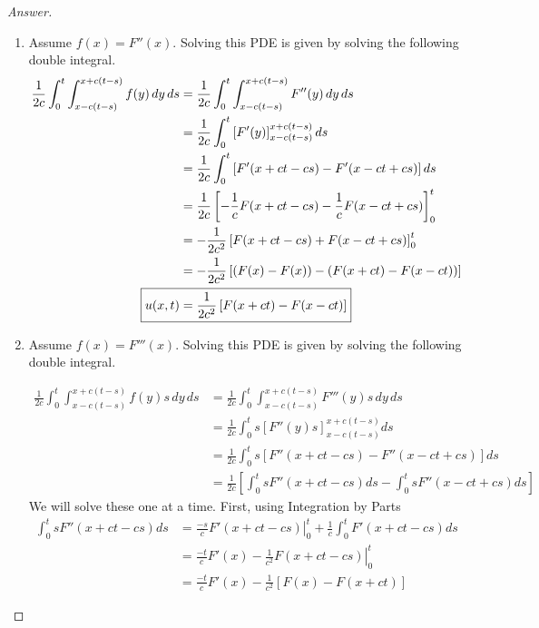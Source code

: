 \documentclass{article}
\theoremstyle{definition}
\renewcommand\qedsymbol{$\blacksquare$}
\newenvironment{ans}{\begin{proof}[Answer]\renewcommand{\qedsymbol}{}}{\end{proof}}
\begin{document}
\begin{ans}
\begin{enumerate}[(1), series=answers]
            \item Assume $f(x) = F''(x)$. Solving this PDE is given by solving the following double integral.
            \begin{align*}
                \frac{1}{2c}\int_0^t\int_{x-c(t-s)}^{x+c(t-s)}f(y)\,dy\,ds &= \frac{1}{2c}\int_0^t\int_{x-c(t-s)}^{x+c(t-s)}F''(y)\,dy\,ds\\
                &=\frac{1}{2c}\int_0^t\left[F'(y)\right]_{x-c(t-s)}^{x+c(t-s)}ds\\
                &=\frac{1}{2c}\int_0^t\left[F'(x+ct-cs) - F'(x-ct+cs)\right]ds\\
                &=\frac{1}{2c}\left[-\frac{1}{c}F(x+ct-cs) - \frac{1}{c}F(x-ct+cs)\right]_0^t\\
                &=-\frac{1}{2c^2}\left[F(x+ct-cs) + F(x-ct+cs)\right]_0^t\\
                &=-\frac{1}{2c^2}\left[(F(x)-F(x)) - (F(x+ct) - F(x-ct))\right]\\
                \Aboxed{u(x,t) &= \frac{1}{2c^2}\left[F(x+ct) - F(x-ct)\right]}
            \end{align*}

            \item Assume $f(x) = F'''(x)$. Solving this PDE is given by solving the following double integral.

            \begin{align*}
                \frac{1}{2c}\int_0^t\int_{x-c(t-s)}^{x+c(t-s)}f(y)s\,dy\,ds &= \frac{1}{2c}\int_0^t\int_{x-c(t-s)}^{x+c(t-s)}F'''(y)s\,dy\,ds\\
                &=\frac{1}{2c}\int_0^ts\left[F''(y)s\right]_{x-c(t-s)}^{x+c(t-s)}ds\\
                &=\frac{1}{2c}\int_0^ts\left[F''(x+ct-cs) - F''(x-ct+cs)\right]ds\\
                &=\frac{1}{2c}\left[\int_0^tsF''(x+ct-cs)ds - \int_0^t sF''(x-ct+cs)ds\right]
            \end{align*}
            We will solve these one at a time. First, using Integration by Parts
            \begin{align*}
            \int_0^tsF''(x+ct-cs)ds &= \left.\frac{-s}{c}F'(x+ct-cs)\right|_0^t + \frac{1}{c}\int_0^t F'(x+ct-cs)ds\\
            &= \frac{-t}{c}F'(x) - \left.\frac{1}{c^2}F(x+ct-cs)\right|^t_0\\
            &= \frac{-t}{c}F'(x) - \frac{1}{c^2}\left[F(x) - F(x+ct)\right]
            \end{align*}


\end{enumerate}
\end{ans}
\end{document}
